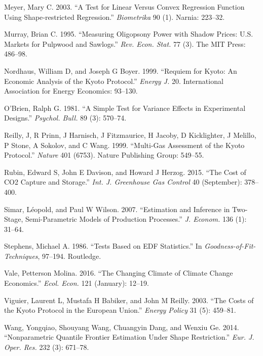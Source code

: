 \documentclass[12pt,]{article}
\begin{document}
\leavevmode\hypertarget{ref-Meyer2003}{}%
Meyer, Mary C. 2003. ``A Test for Linear Versus Convex Regression Function Using Shape‐restricted Regression.'' \emph{Biometrika} 90 (1). Narnia: 223--32.

\leavevmode\hypertarget{ref-Murray1995}{}%
Murray, Brian C. 1995. ``Measuring Oligopsony Power with Shadow Prices: U.S. Markets for Pulpwood and Sawlogs.'' \emph{Rev. Econ. Stat.} 77 (3). The MIT Press: 486--98.

\leavevmode\hypertarget{ref-Nordhaus1999}{}%
Nordhaus, William D, and Joseph G Boyer. 1999. ``Requiem for Kyoto: An Economic Analysis of the Kyoto Protocol.'' \emph{Energy J.} 20. International Association for Energy Economics: 93--130.

\leavevmode\hypertarget{ref-OBrien1981}{}%
O'Brien, Ralph G. 1981. ``A Simple Test for Variance Effects in Experimental Designs.'' \emph{Psychol. Bull.} 89 (3): 570--74.

\leavevmode\hypertarget{ref-Reilly1999}{}%
Reilly, J, R Prinn, J Harnisch, J Fitzmaurice, H Jacoby, D Kicklighter, J Melillo, P Stone, A Sokolov, and C Wang. 1999. ``Multi-Gas Assessment of the Kyoto Protocol.'' \emph{Nature} 401 (6753). Nature Publishing Group: 549--55.

\leavevmode\hypertarget{ref-Rubin2015}{}%
Rubin, Edward S, John E Davison, and Howard J Herzog. 2015. ``The Cost of CO2 Capture and Storage.'' \emph{Int. J. Greenhouse Gas Control} 40 (September): 378--400.

\leavevmode\hypertarget{ref-Simar2007}{}%
Simar, Léopold, and Paul W Wilson. 2007. ``Estimation and Inference in Two-Stage, Semi-Parametric Models of Production Processes.'' \emph{J. Econom.} 136 (1): 31--64.

\leavevmode\hypertarget{ref-Stephens1986}{}%
Stephens, Michael A. 1986. ``Tests Based on EDF Statistics.'' In \emph{Goodness-of-Fit-Techniques}, 97--194. Routledge.

\leavevmode\hypertarget{ref-Vale2016}{}%
Vale, Petterson Molina. 2016. ``The Changing Climate of Climate Change Economics.'' \emph{Ecol. Econ.} 121 (January): 12--19.

\leavevmode\hypertarget{ref-Viguier2003}{}%
Viguier, Laurent L, Mustafa H Babiker, and John M Reilly. 2003. ``The Costs of the Kyoto Protocol in the European Union.'' \emph{Energy Policy} 31 (5): 459--81.

\leavevmode\hypertarget{ref-Wang2014}{}%
Wang, Yongqiao, Shouyang Wang, Chuangyin Dang, and Wenxiu Ge. 2014. ``Nonparametric Quantile Frontier Estimation Under Shape Restriction.'' \emph{Eur. J. Oper. Res.} 232 (3): 671--78.
\end{document}
